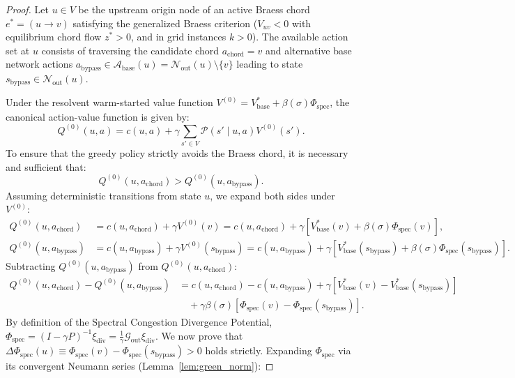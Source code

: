 \documentclass[11pt,a4paper]{article}
\begin{document}
\begin{proof}
Let $u \in V$ be the upstream origin node of an active Braess chord $e^* = (u \to v)$ satisfying the generalized Braess criterion ($V_{uv} < 0$ with equilibrium chord flow $z^* > 0$, and in grid instances $k > 0$). The available action set at $u$ consists of traversing the candidate chord $a_{\text{chord}} = v$ and alternative base network actions $a_{\text{bypass}} \in \mathcal{A}_{\text{base}}(u) = \mathcal{N}_{\text{out}}(u) \setminus \{v\}$ leading to state $s_{\text{bypass}} \in \mathcal{N}_{\text{out}}(u)$.

Under the resolvent warm-started value function $V^{(0)} = V_{\text{base}}^* + \beta(\sigma) \Phi_{\text{spec}}$, the canonical action-value function is given by:
\begin{equation}
Q^{(0)}(u, a) = c(u, a) + \gamma \sum_{s' \in V} \mathcal{P}(s' \mid u, a) V^{(0)}(s').
\end{equation}
To ensure that the greedy policy strictly avoids the Braess chord, it is necessary and sufficient that:
\begin{equation}
Q^{(0)}(u, a_{\text{chord}}) > Q^{(0)}(u, a_{\text{bypass}}).
\end{equation}
Assuming deterministic transitions from state $u$, we expand both sides under $V^{(0)}$:
\begin{align}
Q^{(0)}(u, a_{\text{chord}}) &= c(u, a_{\text{chord}}) + \gamma V^{(0)}(v) = c(u, a_{\text{chord}}) + \gamma \left[ V_{\text{base}}^*(v) + \beta(\sigma) \Phi_{\text{spec}}(v) \right], \\
Q^{(0)}(u, a_{\text{bypass}}) &= c(u, a_{\text{bypass}}) + \gamma V^{(0)}(s_{\text{bypass}}) = c(u, a_{\text{bypass}}) + \gamma \left[ V_{\text{base}}^*(s_{\text{bypass}}) + \beta(\sigma) \Phi_{\text{spec}}(s_{\text{bypass}}) \right].
\end{align}
Subtracting $Q^{(0)}(u, a_{\text{bypass}})$ from $Q^{(0)}(u, a_{\text{chord}})$:
\begin{equation}
\begin{split}
Q^{(0)}(u, a_{\text{chord}}) - Q^{(0)}(u, a_{\text{bypass}}) &= c(u, a_{\text{chord}}) - c(u, a_{\text{bypass}}) + \gamma \left[ V_{\text{base}}^*(v) - V_{\text{base}}^*(s_{\text{bypass}}) \right] \\
&\quad + \gamma \beta(\sigma) \left[ \Phi_{\text{spec}}(v) - \Phi_{\text{spec}}(s_{\text{bypass}}) \right].
\end{split}
\end{equation}
By definition of the Spectral Congestion Divergence Potential, $\Phi_{\text{spec}} = (I - \gamma P)^{-1} \xi_{\text{div}} = \frac{1}{\gamma} \mathcal{G}_{\text{out}} \xi_{\text{div}}$. We now prove that $\Delta \Phi_{\text{spec}}(u) \equiv \Phi_{\text{spec}}(v) - \Phi_{\text{spec}}(s_{\text{bypass}}) > 0$ holds strictly. Expanding $\Phi_{\text{spec}}$ via its convergent Neumann series (Lemma~\ref{lem:green_norm}):

\end{proof}
\end{document}
